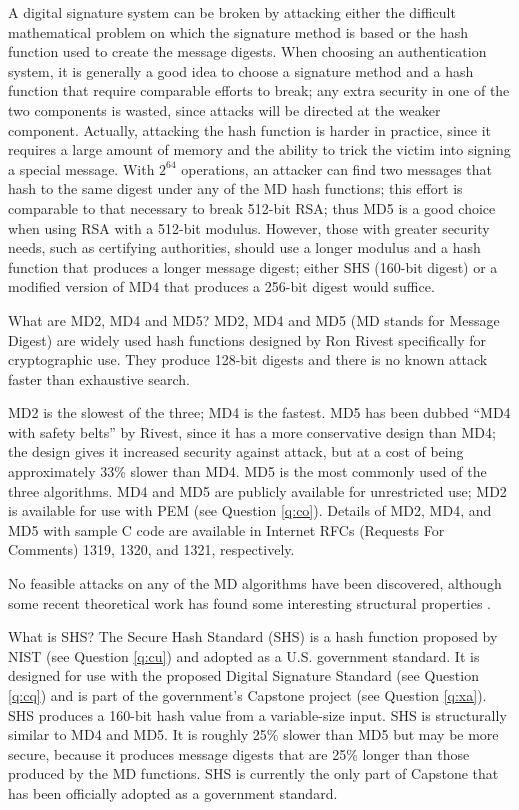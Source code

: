 A digital signature system can be broken by attacking either the difficult
mathematical problem on which the signature method is based or the hash 
function used to create the message digests. When choosing an authentication 
system, it is generally a good idea to choose a signature method and a hash 
function that require comparable efforts to break; any extra security in one 
of the two components is wasted, since attacks will be directed at the weaker 
component. Actually, attacking the hash function is harder in practice, since 
it requires a large amount of memory and the ability to trick the victim into 
signing a special message. With $2^{64}$ operations, an attacker can find two 
messages that hash to the same digest under any of the MD hash functions; 
this effort is comparable to that necessary to break 512-bit RSA; thus MD5 is 
a good choice when using RSA with a 512-bit modulus. However, those with 
greater security needs, such as certifying authorities, should use a longer 
modulus and a hash function that produces a longer message digest; either SHS 
(160-bit digest) or a modified version of MD4 that produces a 256-bit digest 
\cite{rivest-md4} would suffice.

{What are MD2, MD4 and MD5?}
MD2, MD4 and MD5 (MD stands for Message Digest) are widely used hash 
functions designed by Ron Rivest specifically for cryptographic use.
They produce 128-bit digests and there is no known attack faster than 
exhaustive search.

MD2 is the slowest of the three; MD4 \cite {rivest-md4} is the fastest. MD5 
\cite {rivest-rfc-md5} has been dubbed ``MD4 with safety belts'' by Rivest, 
since it has a more conservative design than MD4; the design gives it 
increased security against attack, but at a cost of being approximately 
33\% slower than MD4. MD5 is the most commonly used of the three algorithms. 
MD4 and MD5 are publicly available for unrestricted use; MD2 is available
for use with PEM (see Question \ref{q:co}). Details of MD2, MD4, and MD5 
with sample C code are available in Internet RFCs (Requests For Comments) 
1319, 1320, and 1321, respectively. 

No feasible attacks on any of the MD algorithms have been discovered, 
although some recent theoretical work has found some interesting
structural properties \cite{den-boer-md4,den-boer-md5}. 

{What is SHS?}
The Secure Hash Standard (SHS) \cite{nist-shs-fips} is a hash function 
proposed by NIST (see Question \ref{q:cu}) and adopted as a U.S. government 
standard. It is designed for use with the proposed Digital Signature 
Standard (see Question \ref{q:cq}) and is part of the government's 
Capstone project (see Question \ref{q:xa}). SHS produces a 160-bit hash 
value from a variable-size input. SHS is structurally similar to MD4 and 
MD5. It is roughly 25\% slower than MD5 but may be more secure, because 
it produces message digests that are 25\% longer than those produced by 
the MD functions. SHS is currently the only part of Capstone that has 
been officially adopted as a government standard.

